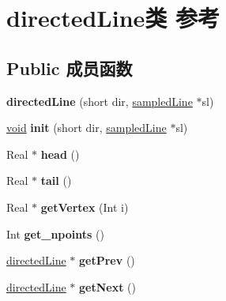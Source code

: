 \hypertarget{classdirected_line}{}\section{directed\+Line类 参考}
\label{classdirected_line}
\subsection*{Public 成员函数}
\begin{DoxyCompactItemize}
\item 
\mbox{\label{classdirected_line_a4f699a8d07d569eb4c043e325b2daa4d}} 
{\bfseries directed\+Line} (short dir, \hyperlink{classsampled_line}{sampled\+Line} $\ast$sl)
\item 
\mbox{\label{classdirected_line_ab830cd440c207910c4ae12145e051cdd}} 
\hyperlink{interfacevoid}{void} {\bfseries init} (short dir, \hyperlink{classsampled_line}{sampled\+Line} $\ast$sl)
\item 
\mbox{\label{classdirected_line_ab28c86e3f916c9f942fa91207ad37482}} 
Real $\ast$ {\bfseries head} ()
\item 
\mbox{\label{classdirected_line_ad61bcf76827d868610b5a89ba4696220}} 
Real $\ast$ {\bfseries tail} ()
\item 
\mbox{\label{classdirected_line_a836c6a5726b70e7526b7aca0bcd9adfc}} 
Real $\ast$ {\bfseries get\+Vertex} (Int i)
\item 
\mbox{\label{classdirected_line_a01a9ec5656ba1c1f3955274e3a58c08c}} 
Int {\bfseries get\+\_\+npoints} ()
\item 
\mbox{\label{classdirected_line_a1b28bfd7a0234c729076551754057f1f}} 
\hyperlink{classdirected_line}{directed\+Line} $\ast$ {\bfseries get\+Prev} ()
\item 
\mbox{\label{classdirected_line_aaabf6f393853198aca2e76a7b882eff1}} 
\hyperlink{classdirected_line}{directed\+Line} $\ast$ {\bfseries get\+Next} ()
\item 
\mbox{\label{classdirected_line_a9b5ce7ef65de3da39b09b8d157de651e}} 

\end{DoxyCompactItemize}
